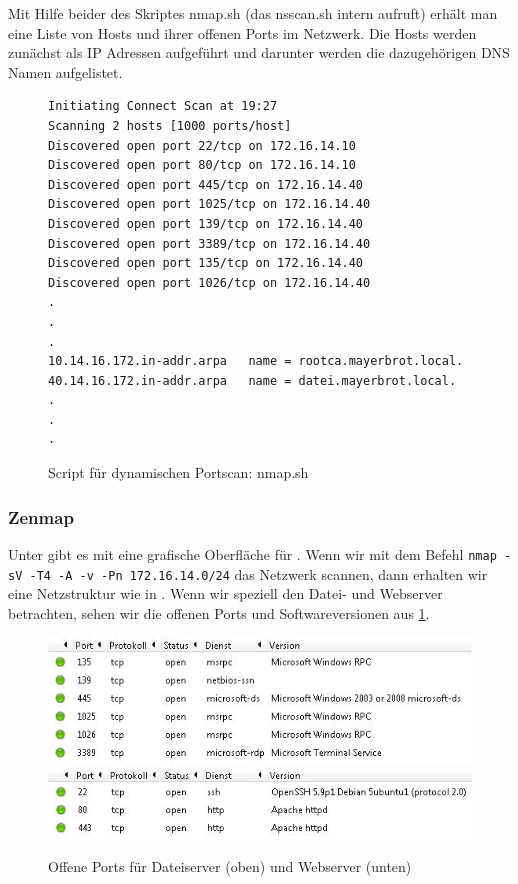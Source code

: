 Mit Hilfe beider des Skriptes nmap.sh (das nsscan.sh intern aufruft) erhält man
eine Liste von Hosts und ihrer offenen Ports im Netzwerk. Die Hosts werden
zunächst als IP Adressen aufgeführt und darunter werden die dazugehörigen DNS
Namen aufgelistet.
\begin{figure}
\begin{lstlisting}
Initiating Connect Scan at 19:27
Scanning 2 hosts [1000 ports/host]
Discovered open port 22/tcp on 172.16.14.10
Discovered open port 80/tcp on 172.16.14.10
Discovered open port 445/tcp on 172.16.14.40
Discovered open port 1025/tcp on 172.16.14.40
Discovered open port 139/tcp on 172.16.14.40
Discovered open port 3389/tcp on 172.16.14.40
Discovered open port 135/tcp on 172.16.14.40
Discovered open port 1026/tcp on 172.16.14.40
.
.
.
10.14.16.172.in-addr.arpa	name = rootca.mayerbrot.local.
40.14.16.172.in-addr.arpa	name = datei.mayerbrot.local.
.
.
.
\end{lstlisting}
\caption{Script für dynamischen Portscan: nmap.sh}

\end{figure}

\subsubsection{Zenmap}

Unter \Windows{} gibt es mit \Zenmap{} eine grafische Oberfläche für \Nmap{}. Wenn wir mit dem Befehl 
\lstinline{nmap -sV -T4 -A -v -Pn 172.16.14.0/24} das Netzwerk scannen, dann erhalten wir eine Netzstruktur wie in
 . Wenn wir speziell den Datei- und Webserver betrachten, sehen wir die offenen Ports und Softwareversionen aus \cref{fig:offeneports}.


\begin{figure}
 \centering
 \includegraphics[width=\textwidth,keepaspectratio=true]{Images/dateiserverports}
 \includegraphics[width=\textwidth,keepaspectratio=true]{Images/webserverports}
 \caption{Offene Ports für Dateiserver (oben) und Webserver (unten)}
 \label{fig:offeneports}
\end{figure}


